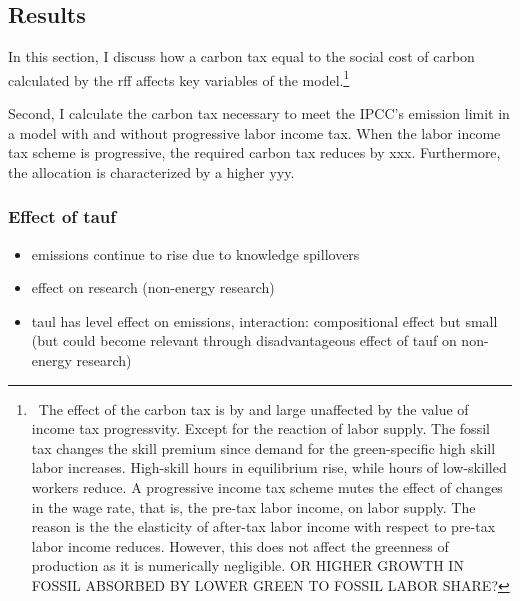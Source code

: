 \subsection{Results }
In this section, I discuss how a carbon tax equal to the social cost of carbon calculated by the rff affects key variables of the model.\footnote{\ The effect of the carbon tax is by and large unaffected by the value of income tax progressvity. Except for the reaction of labor supply. The fossil tax changes the skill premium since demand for the green-specific high skill labor increases. High-skill hours in equilibrium rise, while hours of low-skilled workers reduce.  A progressive income tax scheme mutes the effect of changes in the wage rate, that is, the pre-tax labor income, on labor supply. The reason is the the elasticity of after-tax labor income with respect to pre-tax labor income reduces. However, this does not affect the greenness of production as it is numerically negligible. OR HIGHER GROWTH IN FOSSIL ABSORBED BY LOWER GREEN TO FOSSIL LABOR SHARE?}

Second, I calculate the carbon tax necessary to meet the IPCC's emission limit in a model with and without progressive labor income tax. When the labor income tax scheme is progressive, the required carbon tax reduces by xxx. Furthermore, the allocation is characterized by a higher yyy. 


\subsubsection{Effect of tauf}
 \begin{itemize}
 	\item  emissions continue to rise due to knowledge spillovers \checkmark
 	\item  effect on research (non-energy research) \checkmark
 	\item taul has level effect on emissions, interaction: compositional effect but small (but could become relevant through disadvantageous effect of tauf on non-energy research) \checkmark 	
 \end{itemize}

